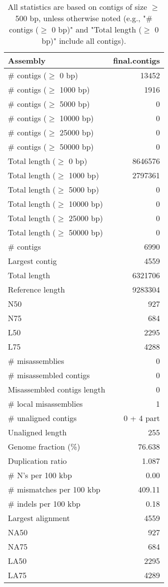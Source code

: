 \documentclass[12pt,a4paper]{article}
\begin{document}
\begin{table}[ht]
\begin{center}
\caption{All statistics are based on contigs of size $\geq$ 500 bp, unless otherwise noted (e.g., "\# contigs ($\geq$ 0 bp)" and "Total length ($\geq$ 0 bp)" include all contigs).}
\begin{tabular}{|l*{1}{|r}|}
\hline
Assembly & final.contigs \\ \hline
\# contigs ($\geq$ 0 bp) & 13452 \\ \hline
\# contigs ($\geq$ 1000 bp) & 1916 \\ \hline
\# contigs ($\geq$ 5000 bp) & 0 \\ \hline
\# contigs ($\geq$ 10000 bp) & 0 \\ \hline
\# contigs ($\geq$ 25000 bp) & 0 \\ \hline
\# contigs ($\geq$ 50000 bp) & 0 \\ \hline
Total length ($\geq$ 0 bp) & 8646576 \\ \hline
Total length ($\geq$ 1000 bp) & 2797361 \\ \hline
Total length ($\geq$ 5000 bp) & 0 \\ \hline
Total length ($\geq$ 10000 bp) & 0 \\ \hline
Total length ($\geq$ 25000 bp) & 0 \\ \hline
Total length ($\geq$ 50000 bp) & 0 \\ \hline
\# contigs & 6990 \\ \hline
Largest contig & 4559 \\ \hline
Total length & 6321706 \\ \hline
Reference length & 9283304 \\ \hline
N50 & 927 \\ \hline
N75 & 684 \\ \hline
L50 & 2295 \\ \hline
L75 & 4288 \\ \hline
\# misassemblies & 0 \\ \hline
\# misassembled contigs & 0 \\ \hline
Misassembled contigs length & 0 \\ \hline
\# local misassemblies & 1 \\ \hline
\# unaligned contigs & 0 + 4 part \\ \hline
Unaligned length & 255 \\ \hline
Genome fraction (\%) & 76.638 \\ \hline
Duplication ratio & 1.087 \\ \hline
\# N's per 100 kbp & 0.00 \\ \hline
\# mismatches per 100 kbp & 409.11 \\ \hline
\# indels per 100 kbp & 0.18 \\ \hline
Largest alignment & 4559 \\ \hline
NA50 & 927 \\ \hline
NA75 & 684 \\ \hline
LA50 & 2295 \\ \hline
LA75 & 4289 \\ \hline
\end{tabular}
\end{center}
\end{table}
\end{document}
